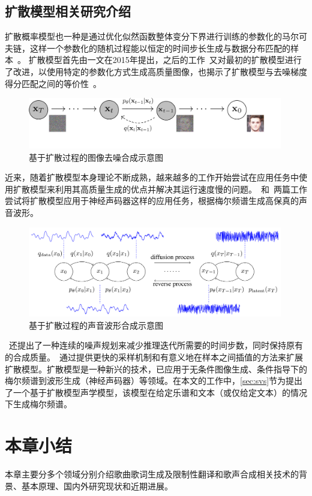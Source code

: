 \subsection{扩散模型相关研究介绍}
扩散概率模型也一种是通过优化似然函数整体变分下界进行训练的参数化的马尔可夫链，这样一个参数化的随机过程能以恒定的时间步长生成与数据分布匹配的样本~\citep{Ho2020ddpm}。
扩散模型首先由\citet{sohl2015deep}一文在2015年提出，之后的工作\citet{Ho2020ddpm}~又对最初的扩散模型进行了改进，以使用特定的参数化方式生成高质量图像，也揭示了扩散模型与去噪梯度得分匹配之间的等价性~\citep{song2019generative,song2021scorebased}。
\begin{figure}[htbp]
  \includegraphics[width=0.99\textwidth]{figure/related/ddpm.pdf}
  \caption{基于扩散过程的图像去噪合成示意图}
\end{figure}
近来，随着扩散模型本身理论不断成熟，越来越多的工作开始尝试在应用任务中使用扩散模型来利用其高质量生成的优点并解决其运行速度慢的问题。\citet{kong2021diffwave}~和\citet{chen2021wavegrad}~两篇工作尝试将扩散模型应用于神经声码器这样的应用任务，根据梅尔频谱生成高保真的声音波形。
\begin{figure}[htbp]
  \includegraphics[width=0.99\textwidth]{figure/related/diffwave.png}
  \caption{基于扩散过程的声音波形合成示意图}
\end{figure}
\citet{chen2021wavegrad}~还提出了一种连续的噪声规划来减少推理迭代所需要的时间步数，同时保持原有的合成质量。\citet{song2021denoising}~通过提供更快的采样机制和有意义地在样本之间插值的方法来扩展扩散模型。扩散模型是一种新兴的技术，已应用于无条件图像生成、条件指导下的梅尔频谱到波形生成（神经声码器）等领域。在本文的工作中，\ref{sec:svs}节为提出了一个基于扩散模型声学模型，该模型在给定乐谱和文本（或仅给定文本）的情况下生成梅尔频谱。
\section{本章小结}
本章主要分多个领域分别介绍歌曲歌词生成及限制性翻译和歌声合成相关技术的背景、基本原理、国内外研究现状和近期进展。
